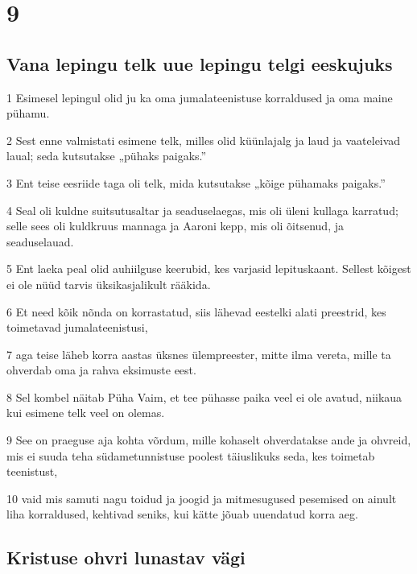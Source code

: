 \chapter{9}

\section*{Vana lepingu telk uue lepingu telgi eeskujuks}

\par 1 Esimesel lepingul olid ju ka oma jumalateenistuse korraldused ja oma maine pühamu.
\par 2 Sest enne valmistati esimene telk, milles olid küünlajalg ja laud ja vaateleivad laual; seda kutsutakse „pühaks paigaks.”
\par 3 Ent teise eesriide taga oli telk, mida kutsutakse „kõige pühamaks paigaks.”
\par 4 Seal oli kuldne suitsutusaltar ja seaduselaegas, mis oli üleni kullaga karratud; selle sees oli kuldkruus mannaga ja Aaroni kepp, mis oli õitsenud, ja seaduselauad.
\par 5 Ent laeka peal olid auhiilguse keerubid, kes varjasid lepituskaant. Sellest kõigest ei ole nüüd tarvis üksikasjalikult rääkida.
\par 6 Et need kõik nõnda on korrastatud, siis lähevad eestelki alati preestrid, kes toimetavad jumalateenistusi,
\par 7 aga teise läheb korra aastas üksnes ülempreester, mitte ilma vereta, mille ta ohverdab oma ja rahva eksimuste eest.
\par 8 Sel kombel näitab Püha Vaim, et tee pühasse paika veel ei ole avatud, niikaua kui esimene telk veel on olemas.
\par 9 See on praeguse aja kohta võrdum, mille kohaselt ohverdatakse ande ja ohvreid, mis ei suuda teha südametunnistuse poolest täiuslikuks seda, kes toimetab teenistust,
\par 10 vaid mis samuti nagu toidud ja joogid ja mitmesugused pesemised on ainult liha korraldused, kehtivad seniks, kui kätte jõuab uuendatud korra aeg.

\section*{Kristuse ohvri lunastav vägi}

